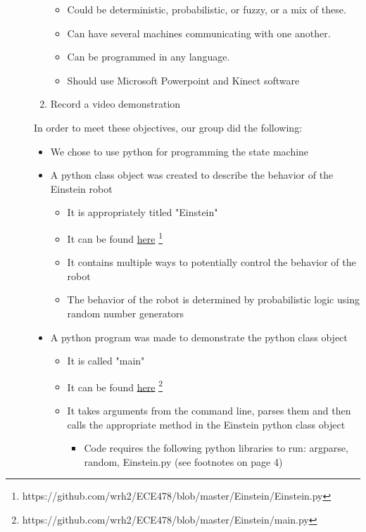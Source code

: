 \documentclass[12pt]{article}
\begin{document}
\begin{description}
\begin{enumerate}
				\begin{itemize}
					\item Could be deterministic, probabilistic, or fuzzy, or a mix of these.
					\item Can have several machines communicating with one another.
					\item Can be programmed in any language.
					\item Should use Microsoft Powerpoint and Kinect software
				\end{itemize} 
			\item Record a video demonstration
		\end{enumerate}
		In order to meet these objectives, our group did the following:
		\begin{itemize}
			\item We chose to use python for programming the state machine
			\item A python class object was created to describe the behavior of the Einstein robot
				\begin{itemize}
					\item It is appropriately titled "Einstein"
					\item It can be found \href{https://github.com/wrh2/ECE478/blob/master/Einstein/Einstein.py}{here} \footnote{https://github.com/wrh2/ECE478/blob/master/Einstein/Einstein.py}
					\item It contains multiple ways to potentially control the behavior of the robot
					\item The behavior of the robot is determined by probabilistic logic using random number generators
				\end{itemize}
			\newpage
			\item A python program was made to demonstrate the python class object
				\begin{itemize}
					\item It is called "main"
					\item It can be found \href{https://github.com/wrh2/ECE478/blob/master/Einstein/main.py}{here} \footnote{https://github.com/wrh2/ECE478/blob/master/Einstein/main.py}
					\item It takes arguments from the command line, parses them and then calls the appropriate method in the Einstein python class object
						\begin{itemize}
							\item Code requires the following python libraries to run: argparse, random, Einstein.py (see footnotes on page 4)

\end{itemize}
\end{itemize}
\end{itemize}
\end{description}
\end{document}
